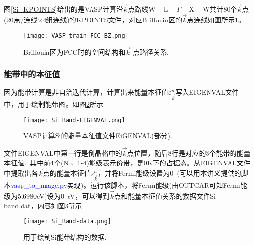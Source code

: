 图\ref{Si_KPOINTS}给出的是\textrm{VASP}计算沿$\vec k$点路线$\mathrm{W}-\mathrm{L}-\Gamma-\mathrm{X}-\mathrm{W}$共计80个$\vec k$点(20点/连线$\times$4组连线)的\textrm{KPOINTS}文件，对应\textrm{Brillouin}区的$\vec k$点连线如图所示\ref{VASP_train-FCC-BZ}。
\begin{figure}[h!]
\centering 
\texttt{[image: VASP\_train-FCC-BZ.png]}
\caption{\small \textrm{Brillouin}区为\textrm{FCC}时的空间结构和$\vec k$-点路径关系.}%
\label{VASP_train-FCC-BZ}
\end{figure}

\subsubsection{\rm{能带中的本征值}}
因为能带计算是非自洽迭代计算，计算出来能量本征值$\varepsilon_{\vec k}^n$写入\textrm{EIGENVAL}文件中，用于绘制能带图。如图\ref{Si_Band-EIGENVAL}所示
\begin{figure}[h!]
\centering
\texttt{[image: Si\_Band-EIGENVAL.png]}
\caption{\small \textrm{VASP}计算\textrm{Si}的能量本征值文件\textrm{EiGENVAL}(部分).}%
\label{Si_Band-EIGENVAL}
\end{figure}

文件\textrm{EIGENVAL}中第一行是倒晶格中的$\vec k$点位置，随后8行是对应的8个能带的能量本征值:~其中前4个(\textrm{No.}~1-4)能级表示价带，是0\textrm{K}下的占据态。从\textrm{EIGENVAL}文件中提取出各$\vec k$点的能量本征值$\varepsilon_{\vec k}^n$，并将\textrm{Fermi}能级设置为0~(可以用本讲义提供的脚本\textcolor{blue}{\textrm{vasp\_to\_image.py}}实现)。运行该脚本，将\textrm{Fermi}能级(由\textrm{OUTCAR}可知\textrm{Fermi}能级为5.6980\textrm{eV})设为0~\textrm{eV}，可以得到$\vec k$点和能量本征值关系的数据文件\textrm{Si-band.dat}，内容如图\ref{Si_Band-data}所示

\begin{figure}[h!]
\centering
\texttt{[image: Si\_Band-data.png]}
\caption{\small \textrm{用于绘制\textrm{Si}能带结构的数据.}}%
\label{Si_Band-data}
\end{figure}

